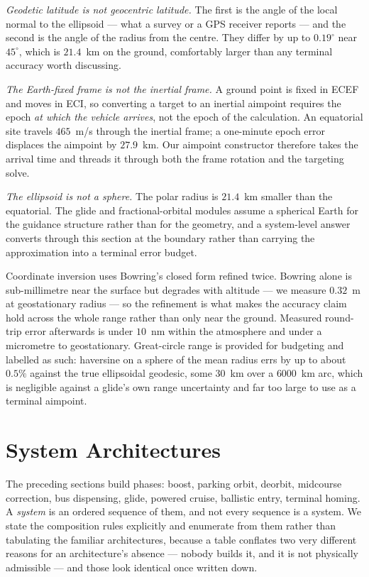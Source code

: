 \documentclass[11pt,a4paper]{article}
\theoremstyle{definition}
\numberwithin{equation}{section}
\begin{document}
\emph{Geodetic latitude is not geocentric latitude.} The first is the angle of the local normal to the ellipsoid --- what a survey or a GPS receiver reports --- and the second is the angle of the radius from the centre. They differ by up to $0.19^\circ$ near $45^\circ$, which is $21.4$~km on the ground, comfortably larger than any terminal accuracy worth discussing.

\emph{The Earth-fixed frame is not the inertial frame.} A ground point is fixed in ECEF and moves in ECI, so converting a target to an inertial aimpoint requires the epoch \emph{at which the vehicle arrives}, not the epoch of the calculation. An equatorial site travels $465$~m/s through the inertial frame; a one-minute epoch error displaces the aimpoint by $27.9$~km. Our aimpoint constructor therefore takes the arrival time and threads it through both the frame rotation and the targeting solve.

\emph{The ellipsoid is not a sphere.} The polar radius is $21.4$~km smaller than the equatorial. The glide and fractional-orbital modules assume a spherical Earth for the guidance structure rather than for the geometry, and a system-level answer converts through this section at the boundary rather than carrying the approximation into a terminal error budget.

Coordinate inversion uses Bowring's closed form refined twice. Bowring alone is sub-millimetre near the surface but degrades with altitude --- we measure $0.32$~m at geostationary radius --- so the refinement is what makes the accuracy claim hold across the whole range rather than only near the ground. Measured round-trip error afterwards is under $10$~nm within the atmosphere and under a micrometre to geostationary. Great-circle range is provided for budgeting and labelled as such: haversine on a sphere of the mean radius errs by up to about $0.5\%$ against the true ellipsoidal geodesic, some $30$~km over a $6000$~km arc, which is negligible against a glide's own range uncertainty and far too large to use as a terminal aimpoint.

\section{System Architectures}
\label{sec:architectures}

The preceding sections build phases: boost, parking orbit, deorbit, midcourse correction, bus dispensing, glide, powered cruise, ballistic entry, terminal homing. A \emph{system} is an ordered sequence of them, and not every sequence is a system. We state the composition rules explicitly and enumerate from them rather than tabulating the familiar architectures, because a table conflates two very different reasons for an architecture's absence --- nobody builds it, and it is not physically admissible --- and those look identical once written down.
\end{document}
